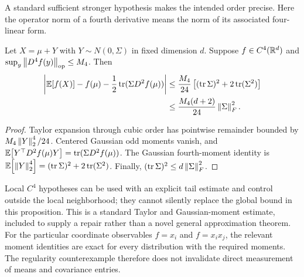 A standard sufficient stronger hypothesis makes the intended order
precise. Here the operator norm of a fourth derivative means the norm
of its associated four-linear form.

\begin{proposition}
\label{prop:c4-remainder}
Let $X=\mu+Y$ with $Y\sim N(0,\Sigma)$ in fixed dimension $d$.
Suppose $f\in C^4(\mathbb R^d)$ and
$\sup_y\left\lVert D^4f(y)\right\rVert_{\rm op}\leq M_4$. Then
\begin{align}
 \left|\mathbb E\!\left[f(X)\right]-f(\mu)-\frac12\operatorname{tr}
                         (\Sigma D^2f(\mu))\right|
 &\leq\frac{M_4}{24}
       \left[(\operatorname{tr}\Sigma)^2+
                         2\operatorname{tr}(\Sigma^2)\right]
       \label{eq:c4-remainder}\\
 &\leq\frac{M_4(d+2)}{24}\left\lVert \Sigma\right\rVert_F^2.
       \nonumber
\end{align}
\end{proposition}

\begin{proof}
Taylor expansion through cubic order has pointwise remainder bounded
by $M_4\left\lVert Y\right\rVert_2^4/24$. Centered Gaussian odd moments vanish, and
$\mathbb E\!\left[Y^\top D^2f(\mu)Y\right]=\operatorname{tr}(\Sigma D^2f(\mu))$.
The Gaussian fourth-moment identity is
$\mathbb E\!\left[\left\lVert Y\right\rVert_2^4\right]=(\operatorname{tr}\Sigma)^2+
2\operatorname{tr}(\Sigma^2)$. Finally,
$(\operatorname{tr}\Sigma)^2\leq d\left\lVert \Sigma\right\rVert_F^2$.
\end{proof}

Local $C^4$ hypotheses can be used with an explicit tail estimate and
control outside the local neighborhood; they cannot silently replace
the global bound in this proposition. This is a standard Taylor and
Gaussian-moment estimate, included to supply a repair rather than a
novel general approximation theorem. For the particular coordinate
observables $f=x_i$ and $f=x_ix_j$, the relevant moment identities are
exact for every distribution with the required moments. The regularity
counterexample therefore does not invalidate direct measurement of
means and covariance entries.
